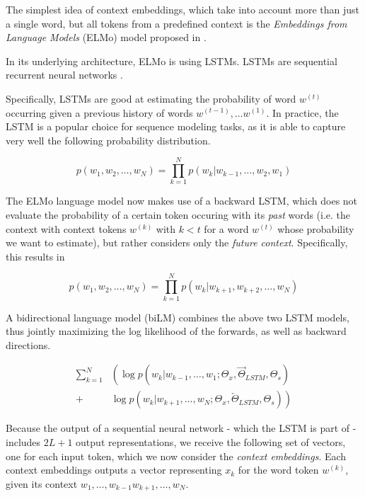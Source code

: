 \documentclass[a4paper,12pt,twoside,openright]{report}
\begin{document}
The simplest idea of context embeddings, which take into account more than just a single word, but all tokens from a predefined context is the \textit{Embeddings from Language Models} (ELMo) model proposed in \cite{peters17}.

In its underlying architecture, ELMo is using LSTMs.
LSTMs are sequential recurrent neural networks .

Specifically, LSTMs \cite{hochreiter97} are good at estimating the probability of word $w^{(t)}$ occurring given a previous history of words $w^{(t-1)}, \ldots w^{(1)}$.
In practice, the LSTM is a popular choice for sequence modeling tasks, as it is able to capture very well the following probability distribution.

\begin{equation}
p\left(w_{1},  w_{2}, \ldots, w_{N} \right)=\prod_{k=1}^{N} p\left(w_{k} | w_{k-1}, \ldots, w_{2}, w_{1}\right)
\end{equation}

The ELMo language model now makes use of a backward LSTM, which does not evaluate the probability of a certain token occuring with its \textit{past} words (i.e. the context with context tokens $w^{(k)}$ with $k < t$ for a word $w^{(t)}$ whose probability we want to estimate), but rather considers only the \textit{future context}.
Specifically, this results in 

\begin{equation}
p\left(w_{1},  w_{2}, \ldots, w_{N} \right)=\prod_{k=1}^{N} p\left(w_{k} | w_{k+1}, w_{k+2}, \ldots, w_{N}\right)
\end{equation}

A bidirectional language model (biLM) combines the above two LSTM models, thus jointly maximizing the log likelihood of the forwards, as well as backward directions.

\begin{align} 
\sum_{k=1}^{N} &\left(\log p\left(w_{k} | w_{k-1}, \ldots, w_{1} ; \Theta_{x}, \vec{\Theta}_{L S T M}, \Theta_{s}\right)\right.\\
+&\left.\log p\left(w_{k} | w_{k+1}, \ldots, w_{N}; \Theta_{x}, \overleftarrow{\Theta}_{L S T M}, \Theta_{s}\right)\right) 
\end{align}

Because the output of a sequential neural network - which the LSTM is part of - includes $2L + 1$ output representations, we receive the following set of vectors, one for each input token, which we now consider the \textit{context embeddings}.
Each context embeddings outputs a vector representing $x_{k}$ for the word token $w^{(k)}$, given its context $ w_{1}, \ldots, w_{k-1}  w_{k+1}, \ldots, w_{N}$.
\end{document}
